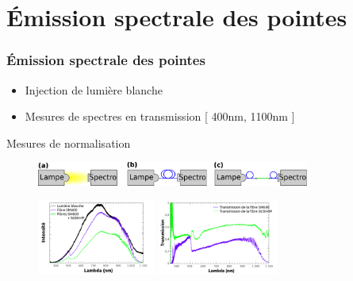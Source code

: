 \documentclass[9pt,a9paper,handout]{beamer}
\begin{document}
\section{Émission spectrale des pointes}
    \begin{frame}
        \frametitle{Émission spectrale des pointes}
        \begin{itemize}
            \item Injection de lumière blanche
            \item Mesures de spectres en transmission [ 400nm, 1100nm ]
        \end{itemize}
        \vspace*{3mm}
        {\large Mesures de normalisation}
        \begin{figure}[h]
            \includegraphics[width=0.8\textwidth]{Images/Spectro/blancspectres}
        \end{figure}

        \begin{figure}[h]
            \includegraphics[width=0.35\textwidth]{Images/Spectro/SpectresNormalisation}
            \qquad
            \includegraphics[width=0.35\textwidth]{Images/Spectro/SpectresNormalisation-Transmission}
        \end{figure}

    \end{frame}
    
\end{document}
